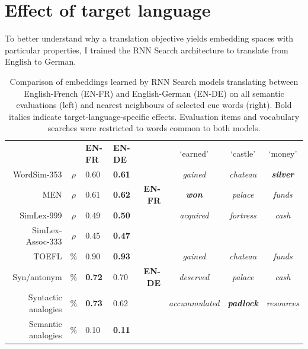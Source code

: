 \section{Effect of target language}
\label{lang_effects}

To better understand why a translation objective yields embedding spaces with particular properties, I trained the RNN Search architecture to translate from English to German. 

\begin{table}[ht]
\small
\begin{center}
\begin{tabular}{r c | m{0.9cm}  m{0.9cm}  r c c c }


    \multicolumn{2}{c|}{~} &\bf  \small EN-FR &\bf  \small EN-DE &  &  `earned' & `castle' & `money'\\ 
\cline{1-4} \cline{6-8}
WordSim-353   & \(\rho\) & 0.60 & \bf 0.61 &   & {\small \emph{gained}} & {\small \emph{chateau}} & {\small \bf \emph{ silver}} \\
MEN & \(\rho\) & 0.61 & \bf 0.62 \bf & \bf \small  EN-FR  & {\small \bf \emph{won}} & {\small \emph{palace}} & {\small \emph{funds}} \\
SimLex-999 & \(\rho\) & 0.49 &  \bf 0.50 &  & {\small \emph{acquired}}  & {\small \emph{fortress}}  & {\small \emph{cash}} \\
\cline{6-8}
SimLex-Assoc-333 & \(\rho\) & 0.45  & \bf 0.47   &   &  &   \\
TOEFL & \(\%\) & 0.90 & \bf 0.93  & &  {\small \emph{gained}}&  {\small \emph{chateau}} &  {\small \emph{funds}} \\ 
Syn/antonym & \(\%\) & \bf 0.72 &  0.70  &  \bf \small EN-DE   &  {\small \emph{deserved}}    &  {\small \emph{palace}}    &  {\small \emph{cash}} \\ 
Syntactic analogies & \(\%\) & \bf 0.73 & 0.62   &  &  {\small \emph{accummulated}}   &  {\small \bf \emph{ padlock}}   &  {\small \emph{resources}} \\  
Semantic analogies & \(\%\) & 0.10 & \bf  0.11  \\
\end{tabular}
\caption{Comparison of embeddings learned by RNN Search models translating between English-French (EN-FR) and English-German (EN-DE) on all semantic evaluations (left) and nearest neighbours of selected cue words (right). Bold italics indicate target-language-specific effects. Evaluation items and vocabulary searches were restricted to words common to both models. }
\label{table:de}
\end{center}
\vspace{-5mm}
\end{table}

